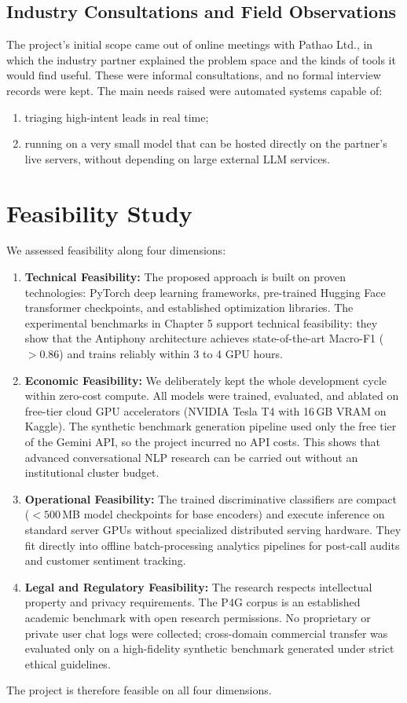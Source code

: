 \subsection{Industry Consultations and Field Observations}
The project's initial scope came out of online meetings with Pathao Ltd., in which the industry partner explained the problem space and the kinds of tools it would find useful. These were informal consultations, and no formal interview records were kept. The main needs raised were automated systems capable of:
\begin{enumerate}[label=(\roman*)]
  \item triaging high-intent leads in real time;
  \item running on a very small model that can be hosted directly on the partner's live servers, without depending on large external LLM services.
\end{enumerate}

\section{Feasibility Study}
\label{sec:feasibility}

We assessed feasibility along four dimensions:
\begin{enumerate}
  \item \textbf{Technical Feasibility:} The proposed approach is built on proven technologies: PyTorch deep learning frameworks, pre-trained Hugging Face transformer checkpoints, and established optimization libraries. The experimental benchmarks in Chapter 5 support technical feasibility: they show that the Antiphony architecture achieves state-of-the-art Macro-F1 ($>0.86$) and trains reliably within 3 to 4 GPU hours.
  \item \textbf{Economic Feasibility:} We deliberately kept the whole development cycle within zero-cost compute. All models were trained, evaluated, and ablated on free-tier cloud GPU accelerators (NVIDIA Tesla T4 with 16\,GB VRAM on Kaggle). The synthetic benchmark generation pipeline used only the free tier of the Gemini API, so the project incurred no API costs. This shows that advanced conversational NLP research can be carried out without an institutional cluster budget.
  \item \textbf{Operational Feasibility:} The trained discriminative classifiers are compact ($<500$\,MB model checkpoints for base encoders) and execute inference on standard server GPUs without specialized distributed serving hardware. They fit directly into offline batch-processing analytics pipelines for post-call audits and customer sentiment tracking.
  \item \textbf{Legal and Regulatory Feasibility:} The research respects intellectual property and privacy requirements. The P4G corpus is an established academic benchmark with open research permissions. No proprietary or private user chat logs were collected; cross-domain commercial transfer was evaluated only on a high-fidelity synthetic benchmark generated under strict ethical guidelines.
\end{enumerate}
The project is therefore feasible on all four dimensions.
